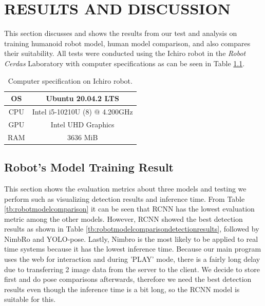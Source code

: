 \chapter{RESULTS AND DISCUSSION}
\label{chap:resultsandiscussion}


This section discusses and shows the results from our test and analysis on training humanoid robot model, human model comparison, and also compares their suitability.
All tests were conducted using the Ichiro robot in the \emph{Robot Cerdas} Laboratory with computer specifications as can be seen in Table \ref{tb:computerspecichiro}.

\begin{longtable}{|c|c|}
  \caption{Computer specification on Ichiro robot.}
  \label{tb:computerspecichiro}\\
  \hline
  OS      & Ubuntu 20.04.2 LTS \\
  \hline
  CPU     & Intel i5-10210U (8) @ 4.200GHz \\
  \hline
  GPU     & Intel UHD Graphics  \\
  \hline
  RAM     & 3636 MiB \\
  \hline
\end{longtable}

\section{Robot's Model Training Result}
\label{sec:robotmodeltrainingresult}

This section shows the evaluation metrics about three models and testing we perform such as visualizing detection results and inference time.
From Table \ref{tb:robotmodelcomparison} it can be seen that RCNN has the lowest evaluation metric among the other models.
However, RCNN showed the best detection results as shown in Table \ref{tb:robotmodelcomparisondetectionresults}, followed by NimbRo and YOLO-pose.
Lastly, Nimbro is the most likely to be applied to real time systems because it has the lowest inference time.
Because our main program uses the web for interaction and during 'PLAY' mode, there is a fairly long delay due to transferring 2 image data from the server to the client.
We decide to store first and do pose comparisons afterwards, therefore we need the best detection results even though the inference time is a bit long, so the RCNN model is suitable for this.

